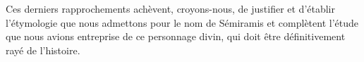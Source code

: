 \documentclass[a4paper, 11pt, oneside, landscape]{article}
\begin{document}
Ces derniers rapprochements achèvent, croyons-nous, de justifier et d'établir l'étymologie que nous admettons pour le nom de Sémiramis et complètent l'étude que nous avions entreprise de ce personnage divin, qui doit être définitivement rayé de l'histoire.

\bigskip \centerline{\EightStarTaper} \centerline{\EightStarTaper\EightStarTaper} \bigskip
\end{document}

